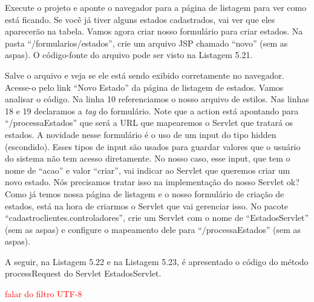 
Execute o projeto e aponte o navegador para a página de listagem para ver como está ficando. Se você já tiver alguns estados cadastrados, vai ver que eles aparecerão na tabela. Vamos agora criar nosso formulário para criar estados. Na pasta ``/formularios/estados'', crie um arquivo JSP chamado ``novo'' (sem as aspas). O código-fonte do arquivo pode ser visto na Listagem 5.21.


Salve o arquivo e veja se ele está sendo exibido corretamente no navegador. Acesse-o pelo link ``Novo Estado'' da página de listagem de estados. Vamos analisar o código. Na linha 10 referenciamos o nosso arquivo de estilos. Nas linhas 18 e 19 declaramos a \textit{tag} do formulário. Note que a action está apontando para ``/processaEstados'' que será a URL que mapearemos o Servlet que tratará os estados. A novidade nesse formulário é o uso de um input do tipo hidden (escondido). Esses tipos de input são usados para guardar valores que o usuário do sistema não tem acesso diretamente. No nosso caso, esse input, que tem o nome de ``acao'' e valor ``criar'', vai indicar ao Servlet que queremos criar um novo estado. Nós precisamos tratar isso na implementação do nosso Servlet ok? Como já temos nossa página de listagem e o nosso formulário de criação de estados, está na hora de criarmos o Servlet que vai gerenciar isso. No pacote ``cadastroclientes.controladores'', crie um Servlet com o nome de ``EstadosServlet'' (sem as aspas) e configure o mapeamento dele para ``/processaEstados'' (sem as aspas).

A seguir, na Listagem 5.22 e na Listagem 5.23, é apresentado o código do método processRequest do Servlet EstadosServlet.


\textcolor{red}{falar do filtro UTF-8}

